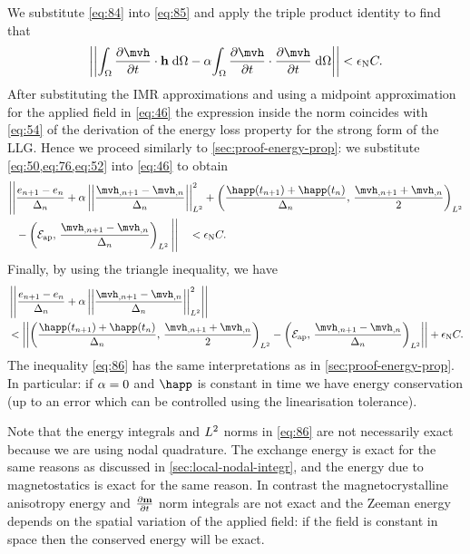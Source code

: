 We substitute \cref{eq:84} into \cref{eq:85} and apply the triple product identity to find that
\begin{equation}
  \norm{\intd{\dmdth \cdot \hv} - \dampc \intd{\dmdth \cdot \dmdth}} < \ntol \sumbasiscoeff.
  \label{eq:46}
\end{equation}
After substituting the IMR approximations and using a midpoint approximation for the applied field in \cref{eq:46} the expression inside the norm coincides with \cref{eq:54} of the derivation of the energy loss property for the strong form of the LLG.
Hence we proceed similarly to \cref{sec:proof-energy-prop}: we substitute  \cref{eq:50,eq:76,eq:52} into \cref{eq:46} to obtain
\begin{equation}
  \begin{aligned}
    \Bigg|\Bigg| &\frac{\e_{n+1} - \e_n}{\dtn} + \dampc \ltnorm{\frac{\mvh_{,n+1} - \mvh_{,n}}{\dtn}}^2 +
      \ltip{\frac{\happ(t_{n+1}) +\happ(t_n)}{\dtn}}{\frac{\mvh_{,n+1} +
          \mvh_{,n}}{2}} \\
      &- \ltip{\happerror}{\frac{\mvh_{,n+1} - \mvh_{,n}}{\dtn}} \Bigg|\Bigg| \quad < \ntol \sumbasiscoeff.
  \end{aligned}
\end{equation}
Finally, by using the triangle inequality, we have
\begin{equation}
  \begin{aligned}
    &\norm{ \frac{\e_{n+1} - \e_n}{\dtn} + \dampc \ltnorm{\frac{\mvh_{,n+1} - \mvh_{,n}}{\dtn}}^2 } \\
    &< \norm{\ltip{\frac{\happ(t_{n+1}) + \happ(t_n)}{\dtn}}{\frac{\mvh_{,n+1} + \mvh_{,n}}{2}} - \ltip{\happerror}{\frac{\mvh_{,n+1} - \mvh_{,n}}{\dtn}} }
  + \ntol \sumbasiscoeff.
  \label{eq:86}
  \end{aligned}
\end{equation}
The inequality \cref{eq:86} has the same interpretations as in \cref{sec:proof-energy-prop}.
In particular: if $\alpha = 0$ and $\happ$ is constant in time we have energy conservation (up to an error which can be controlled using the linearisation tolerance).

Note that the energy integrals and ${L^2}$ norms in \cref{eq:86} are not necessarily exact because we are using nodal quadrature.
The exchange energy is exact for the same reasons as discussed in \cref{sec:local-nodal-integr}, and the energy due to magnetostatics is exact for the same reason.
In contrast the magnetocrystalline anisotropy energy and $\frac{\partial \boldsymbol{\mathrm{m}}}{\partial t}$ norm integrals are not exact and
the Zeeman energy depends on the spatial variation of the applied field: if the field is constant in space then the conserved energy will be exact.

